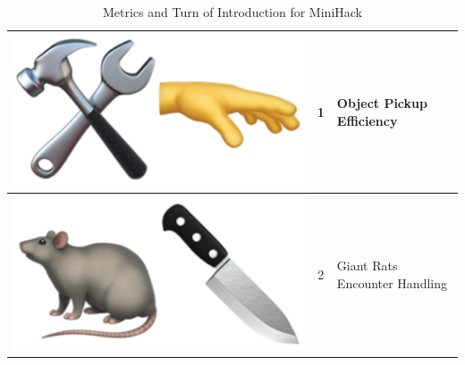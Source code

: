 \begin{table}[ht]
\begin{tabular}{|c|c|l|}
\hline
\rowcolor{gray!30} \includegraphics[scale=0.07]{figs/emojis/mini_8.png} & 1 & Object Pickup Efficiency \\
\hline
\rowcolor{gray!60} \includegraphics[scale=0.07]{figs/emojis/mini_9.png} & 2 & Giant Rats Encounter Handling \\
\hline
\end{tabular}
\caption{Metrics and Turn of Introduction for MiniHack}
\label{tab:metrics_mini}
\end{table}

